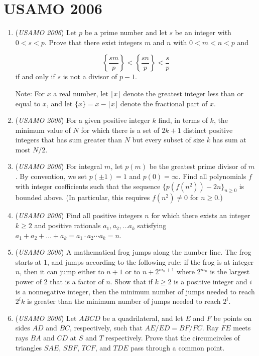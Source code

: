 \section{USAMO 2006}
        \begin{enumerate}
        	\item (\textit{USAMO 2006}) Let $p$ be a prime number and let $s$ be an integer with $0<s<p$. Prove that there exist integers $m$ and $n$ with $0<m<n<p$ and

 \[\left\lbrace\frac{sm}{p}\right\rbrace<\left\lbrace\frac{sn}{p}\right\rbrace<\frac{s}{p}\]
if and only if $s$ is not a divisor of $p-1$.


 Note: For $x$ a real number, let $\lfloor x\rfloor$ denote the greatest integer less than or equal to $x$, and let $\lbrace x\rbrace=x-\lfloor x\rfloor$ denote the fractional part of $x$.


 

	\item (\textit{USAMO 2006}) For a given positive integer $k$ find, in terms of $k$, the minimum value of $N$ for which there is a set of $2k+1$ distinct positive integers that has sum greater than $N$ but every subset of size $k$ has sum at most $N/2$.


 

	\item (\textit{USAMO 2006}) For integral $m$, let $p(m)$ be the greatest prime divisor of $m$. By convention, we set $p(\pm1)=1$ and $p(0)=\infty$. Find all polynomials $f$ with integer coefficients such that the sequence $\lbrace p(f(n^2))-2n\rbrace_{n\ge0}$ is bounded above. (In particular, this requires $f(n^2)\neq0$ for $n\ge0$.)


 

	\item (\textit{USAMO 2006}) Find all positive integers $n$ for which there exists an integer $k\ge 2$ and positive rationals $a_1,a_2,\ldots a_k$ satisfying $a_1+a_2+\ldots+a_k=a_1\cdot a_2\cdots a_k=n$.


 

	\item (\textit{USAMO 2006}) A mathematical frog jumps along the number line. The frog starts at 1, and jumps according to the following rule: if the frog is at integer $n$, then it can jump either to $n+1$ or to $n+2^{m_n+1}$ where $2^{m_n}$ is the largest power of 2 that is a factor of $n$. Show that if $k\ge2$ is a positive integer and $i$ is a nonnegative integer, then the minimum number of jumps needed to reach $2^ik$ is greater than the minimum number of jumps needed to reach $2^i$.


 

	\item (\textit{USAMO 2006}) Let $ABCD$ be a quadrilateral, and let $E$ and $F$ be points on sides $AD$ and $BC$, respectively, such that $AE/ED=BF/FC$.  Ray $FE$ meets rays $BA$ and $CD$ at $S$ and $T$ respectively. Prove that the circumcircles of triangles $SAE$, $SBF$, $TCF$, and $TDE$ pass through a common point.


 

\end{enumerate}